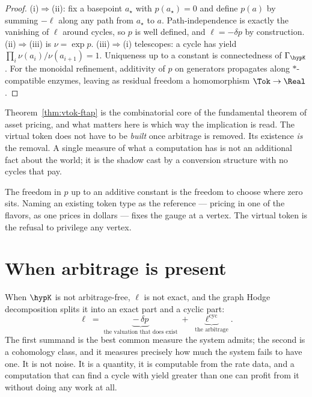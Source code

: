 \begin{proof}
(i)$\Rightarrow$(ii): fix a basepoint $a_\star$ with $p(a_\star) = 0$ and
define $p(a)$ by summing $-\ell$ along any path from $a_\star$ to $a$.
Path-independence is exactly the vanishing of $\ell$ around cycles, so
$p$ is well defined, and $\ell = -\delta p$ by construction.
(ii)$\Rightarrow$(iii) is $\nu = \exp p$.
(iii)$\Rightarrow$(i) telescopes: a cycle has yield
$\prod_i \nu(a_i)/\nu(a_{i+1}) = 1$.
Uniqueness up to a constant is connectedness of $\Gamma_{\hypK}$.
For the monoidal refinement, additivity of $p$ on generators propagates
along $\ast$-compatible enzymes, leaving as residual freedom a
homomorphism $\Tok \to \Real$.
\end{proof}

\begin{remark}
\label{rmk:vtok-direction}
Theorem~\ref{thm:vtok-ftap} is the combinatorial core of the fundamental
theorem of asset pricing, and what matters here is which way the
implication is read.
The virtual token does not have to be \emph{built} once arbitrage is
removed.
Its existence \emph{is} the removal.
A single measure of what a computation has is not an additional fact
about the world; it is the shadow cast by a conversion structure with no
cycles that pay.
\end{remark}

\begin{remark}[Gauge]
\label{rmk:vtok-gauge}
The freedom in $p$ up to an additive constant is the freedom to choose
where zero sits.
Naming an existing token type as the reference --- pricing in one of the
flavors, as one prices in dollars --- fixes the gauge at a vertex.
The virtual token is the refusal to privilege any vertex.
\end{remark}

\section{When arbitrage is present}

When $\hypK$ is not arbitrage-free, $\ell$ is not exact, and the graph
Hodge decomposition splits it into an exact part and a cyclic part:
\[
  \ell \;=\; \underbrace{-\,\delta p}_{\text{the valuation that does exist}}
       \;+\; \underbrace{\ell^{\mathrm{cyc}}}_{\text{the arbitrage}} .
\]
The first summand is the best common measure the system admits; the
second is a cohomology class, and it measures precisely how much the
system fails to have one.
It is not noise.
It is a quantity, it is computable from the rate data, and a computation
that can find a cycle with yield greater than one can profit from it
without doing any work at all.

